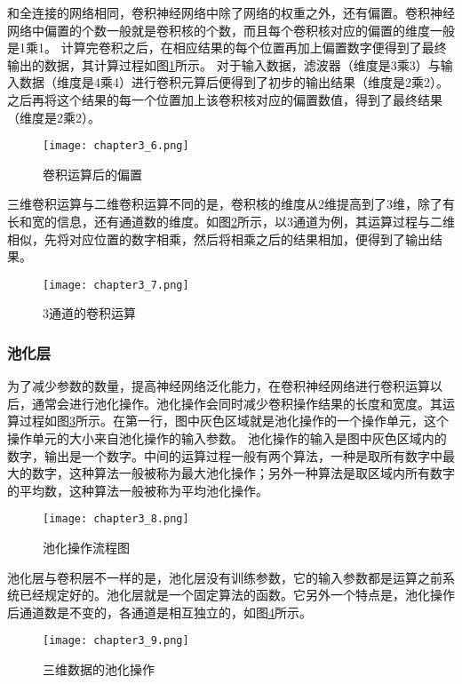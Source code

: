 和全连接的网络相同，卷积神经网络中除了网络的权重之外，还有偏置。卷积神经网络中偏置的个数一般就是卷积核的个数，而且每个卷积核对应的偏置的维度一般是1乘1。
计算完卷积之后，在相应结果的每个位置再加上偏置数字便得到了最终输出的数据，其计算过程如图\ref{fig:chapter3_6}所示。
对于输入数据，滤波器（维度是3乘3）与输入数据（维度是4乘4）进行卷积元算后便得到了初步的输出结果（维度是2乘2）。之后再将这个结果的每一个位置加上该卷积核对应的偏置数值，得到了最终结果（维度是2乘2）。
\begin{figure}
    \centering
    \texttt{[image: chapter3\_6.png]}
    \caption{卷积运算后的偏置\cite{luyujie_216}}
    \label{fig:chapter3_6}
\end{figure}

三维卷积运算与二维卷积运算不同的是，卷积核的维度从2维提高到了3维，除了有长和宽的信息，还有通道数的维度。如图\ref{fig:chapter3_7}所示，以3通道为例，其运算过程与二维相似，先将对应位置的数字相乘，然后将相乘之后的结果相加，便得到了输出结果。
\begin{figure}
    \centering
    \texttt{[image: chapter3\_7.png]}
    \caption{3通道的卷积运算\cite{luyujie_216}}
    \label{fig:chapter3_7}
\end{figure}
\subsubsection{池化层}
为了减少参数的数量，提高神经网络泛化能力，在卷积神经网络进行卷积运算以后，通常会进行池化操作。池化操作会同时减少卷积操作结果的长度和宽度。其运算过程如图\ref{fig:chapter3_8}所示。在第一行，图中灰色区域就是池化操作的一个操作单元，这个操作单元的大小来自池化操作的输入参数。
池化操作的输入是图中灰色区域内的数字，输出是一个数字。中间的运算过程一般有两个算法，一种是取所有数字中最大的数字，这种算法一般被称为最大池化操作；另外一种算法是取区域内所有数字的平均数，这种算法一般被称为平均池化操作。
\begin{figure}
    \centering
    \texttt{[image: chapter3\_8.png]}
    \caption{池化操作流程图\cite{luyujie_216}}
    \label{fig:chapter3_8}
\end{figure}

池化层与卷积层不一样的是，池化层没有训练参数，它的输入参数都是运算之前系统已经规定好的。池化层就是一个固定算法的函数。它另外一个特点是，池化操作后通道数是不变的，各通道是相互独立的，如图\ref{fig:chapter3_9}所示。
\begin{figure}
    \centering
    \texttt{[image: chapter3\_9.png]}
    \caption{三维数据的池化操作\cite{luyujie_216}}
    \label{fig:chapter3_9}
\end{figure}

